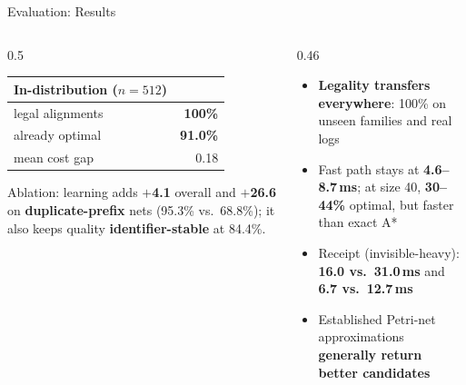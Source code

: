 \documentclass[aspectratio=169]{beamer}
\newcommand{\keyc}[1]{\textbf{\textcolor{larablue}{#1}}}
\newcommand{\keyg}[1]{\textbf{\textcolor{laraaqua!70!black}{#1}}}
\newcommand{\keya}[1]{\textbf{\textcolor{laraamber!85!black}{#1}}}
\begin{document}
\begin{frame}{Evaluation: Results}
  \begin{columns}[T]
  \begin{column}{0.5\textwidth}
    \begin{center}
    \small
    \begin{tabular}{lr}
      \toprule
      In-distribution ($n = 512$) & \\
      \midrule
      legal alignments & \keyg{100\%} \\
      already optimal & \keyc{91.0\%} \\
      mean cost gap & 0.18 \\
      \bottomrule
    \end{tabular}
    \end{center}
    \vspace{2mm}
    \small Ablation: learning adds \keyc{$+$4.1} overall and
    \keyc{$+$26.6} on \keya{duplicate-prefix} nets
    (95.3\% vs.\ 68.8\%); it also keeps quality
    \keyg{identifier-stable} at 84.4\%.
  \end{column}
  \begin{column}{0.46\textwidth}
    \begin{itemize}\setlength{\itemsep}{5pt}
      \item \keyg{Legality transfers everywhere}: 100\% on unseen families
        and real logs
      \item Fast path stays at \keyc{4.6--8.7\,ms}; at size 40,
        \keya{30--44\%} optimal, but faster than exact A*
      \item Receipt (invisible-heavy): \keyc{16.0 vs.\ 31.0\,ms}
        and \keyc{6.7 vs.\ 12.7\,ms}
      \item Established Petri-net approximations
        \keya{generally return better candidates}
    \end{itemize}
  \end{column}
  \end{columns}
\end{frame}
\end{document}
